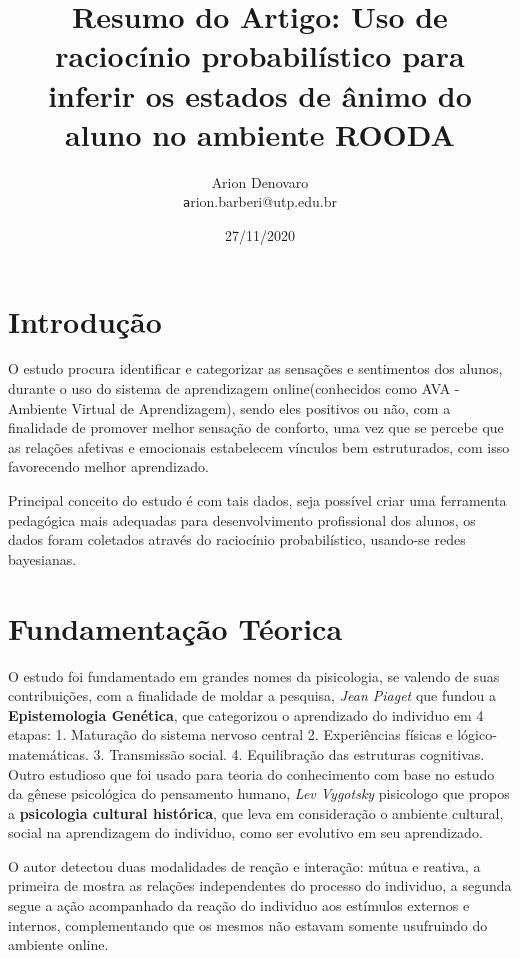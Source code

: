 \documentclass[12pt,a4paper,twocolumn]{article}
\title{Resumo do Artigo: Uso de raciocínio probabilístico para inferir os  estados de ânimo do aluno no ambiente ROODA }
\date{27/11/2020}
\author{Arion Denovaro  \\ \texttt  arion.barberi@utp.edu.br}
\begin{document}
\maketitle
\newpage  


\section{Introdução}
O estudo procura identificar e categorizar as sensações e sentimentos dos alunos, durante o uso do sistema de aprendizagem online(conhecidos como AVA - Ambiente Virtual de Aprendizagem), sendo eles positivos ou não, com a finalidade de promover melhor sensação de conforto, uma vez que se percebe que as relações afetivas e emocionais estabelecem vínculos bem estruturados, com isso favorecendo melhor aprendizado. 


Principal conceito do estudo é com tais dados, seja possível criar uma ferramenta pedagógica mais adequadas para desenvolvimento profissional dos alunos, os dados foram coletados através do raciocínio probabilístico, usando-se redes bayesianas.


\section{Fundamentação Téorica}
O estudo foi fundamentado em grandes nomes da pisicologia, se valendo de suas contribuições, com a finalidade de moldar a pesquisa, \textit{ Jean Piaget} que fundou a \textbf{ Epistemologia Genética}, que categorizou o aprendizado do individuo em 4 etapas: 
1. Maturação do sistema nervoso central
2. Experiências físicas e lógico-matemáticas.
3. Transmissão social.
4. Equilibração das estruturas cognitivas. 
\\
Outro estudioso que foi usado para teoria do conhecimento com base no estudo da gênese psicológica do pensamento humano,\textit{ Lev Vygotsky} pisicologo que propos a \textbf{psicologia cultural histórica}, que leva em consideração o ambiente cultural, social na aprendizagem do individuo, como ser evolutivo em seu aprendizado.

O autor detectou duas modalidades de reação e interação: mútua e reativa, a primeira de mostra as relações independentes do processo do individuo, a segunda segue a ação acompanhado da reação do individuo aos estímulos externos e internos, complementando que os mesmos não estavam somente usufruindo do ambiente online.
\end{document}
